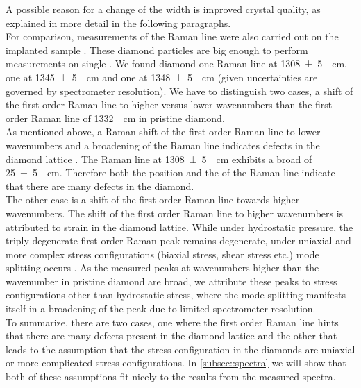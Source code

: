 		A possible reason for a change of the width is improved crystal quality, as explained in more detail in the following paragraphs.
		\\
		For comparison, measurements of the Raman line were also carried out on the implanted sample \implantedTao. 
		These diamond particles are big enough to perform measurements on single \nds.
		We found diamond one Raman line at \SI[separate-uncertainty]{1308+-5}{\per\centi\meter}, one at \SI[separate-uncertainty]{1345+-5}{\per\centi\meter} and one at \SI[separate-uncertainty]{1348+-5}{\per\centi\meter} (given uncertainties are governed by spectrometer resolution).
		We have to distinguish two cases, a shift of the first order Raman line to higher versus lower wavenumbers than the first order Raman line of \SI{1332}{\per\centi\meter} in pristine diamond.
		\\
		As mentioned above, a Raman shift of the first order Raman line to lower wavenumbers and a broadening of the Raman line indicates defects in the diamond lattice \cite{Prawer2004}.
		The Raman line at \SI[separate-uncertainty]{1308+-5}{\per\centi\meter} exhibits a broad \lw of \SI[separate-uncertainty]{25+-5}{\per\centi\meter}.
		Therefore both the position and the \lw of the Raman line indicate that there are many defects in the diamond.
		\\
		The other case is a shift of the first order Raman line towards higher wavenumbers.
		The shift of the first order Raman line to higher wavenumbers is attributed to strain in the diamond lattice.
		While under hydrostatic pressure, the triply degenerate first order Raman peak remains degenerate, under uniaxial and more complex stress configurations (biaxial stress, shear stress etc.) mode splitting occurs \cite{Prawer2004}.
		As the measured peaks at wavenumbers higher than the wavenumber in pristine diamond are broad, we attribute these peaks to stress configurations other than hydrostatic stress, where the mode splitting manifests itself in a broadening of the peak due to limited spectrometer resolution.
		\\
		To summarize, there are two cases, one where the first order Raman line hints that there are many defects present in the diamond lattice and the other that leads to the assumption that the stress configuration in the diamonds are uniaxial or more complicated stress configurations.
		In \autoref{subsec::spectra} we will show that both of these assumptions fit nicely to the results from the measured \pl spectra. 
